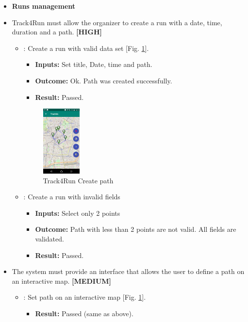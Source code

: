 \documentclass[a4paper, hidelinks, 12pt]{report}
\newcommand\requirement[1]{\item[{[REQ-#1]}] }
\newcommand\test[1]{\item[{[TEST-#1]}] }
\begin{document}
	\begin{itemize}
	\item \textbf{Runs management}
	\requirement{24} Track4Run must allow the organizer to create a run with a date, time, duration and a path. \textbf{[HIGH]}
					\begin{itemize}
		\test{14}: Create a run with valid data set [Fig. \ref{fig:run_path}].
			\begin{itemize}
			\item \textbf{Inputs: } Set title, Date, time and path.			
			\item \textbf{Outcome: } Ok. Path was created successfully.
			\item \textbf{Result: } Passed. 
			\end{itemize}			
			
		\begin{figure}[H]
					\centering
				\includegraphics[width=0.2\textwidth]{images/define_path.jpeg}
					\caption[Track4Run Create path]{Track4Run Create path}
				\label{fig:run_path}
			\end{figure}
			
		\test{15} : Create a run with invalid fields
			\begin{itemize}
			\item \textbf{Inputs: }Select only 2 points
			\item \textbf{Outcome: }Path with less than 2 points are not valid. All fields are validated.
			\item \textbf{Result: } Passed. 
			 \end{itemize}	
	\end{itemize}
	\requirement{25} The system must provide an interface that allows the user to define a path on an interactive map. \textbf{[MEDIUM]}
						\begin{itemize}
		\test{16}: Set path on an interactive map [Fig. \ref{fig:run_path}].
			\begin{itemize}
			\item \textbf{Result: } Passed (same as above). 
			\end{itemize}
	

\end{itemize}
\end{itemize}
\end{document}
